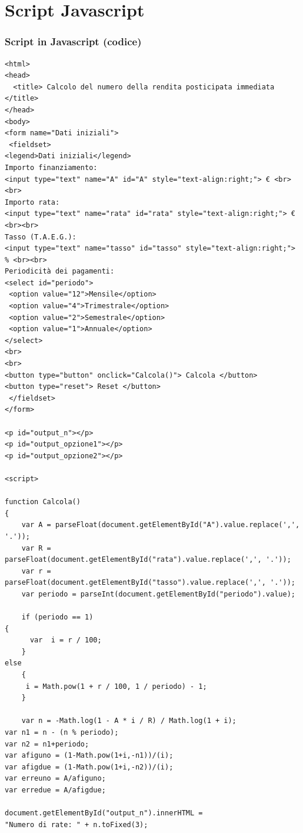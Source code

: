 \documentclass{beamer}
\begin{document}
\section{Script Javascript}

\begin{frame}[fragile,shrink=20]
    \frametitle{Script in Javascript (codice)}

    \setlength{\columnsep}{18cm}
    \begin{multicols}{2}
        
        \begin{verbatim}
<html>
<head>
  <title> Calcolo del numero della rendita posticipata immediata </title>
</head>
<body>
<form name="Dati iniziali">
 <fieldset>
<legend>Dati iniziali</legend>
Importo finanziamento:
<input type="text" name="A" id="A" style="text-align:right;"> € <br><br>
Importo rata:
<input type="text" name="rata" id="rata" style="text-align:right;"> € <br><br>
Tasso (T.A.E.G.):
<input type="text" name="tasso" id="tasso" style="text-align:right;"> % <br><br>
Periodicità dei pagamenti:
<select id="periodo">
 <option value="12">Mensile</option>
 <option value="4">Trimestrale</option>
 <option value="2">Semestrale</option>
 <option value="1">Annuale</option>
</select>
<br>
<br>
<button type="button" onclick="Calcola()"> Calcola </button>
<button type="reset"> Reset </button>
 </fieldset>
</form>

<p id="output_n"></p>
<p id="output_opzione1"></p>
<p id="output_opzione2"></p>

<script>

function Calcola()
{
    var A = parseFloat(document.getElementById("A").value.replace(',', '.'));
    var R = parseFloat(document.getElementById("rata").value.replace(',', '.'));
    var r = parseFloat(document.getElementById("tasso").value.replace(',', '.'));
    var periodo = parseInt(document.getElementById("periodo").value);
   
    if (periodo == 1)
{
      var  i = r / 100;
    }
else
    {
     i = Math.pow(1 + r / 100, 1 / periodo) - 1;
    }

    var n = -Math.log(1 - A * i / R) / Math.log(1 + i);
var n1 = n - (n % periodo);
var n2 = n1+periodo;
var afiguno = (1-Math.pow(1+i,-n1))/(i);
var afigdue = (1-Math.pow(1+i,-n2))/(i);
var erreuno = A/afiguno;
var erredue = A/afigdue;

document.getElementById("output_n").innerHTML = 
"Numero di rate: " + n.toFixed(3);


\end{verbatim}
\end{multicols}
\end{frame}
\end{document}
